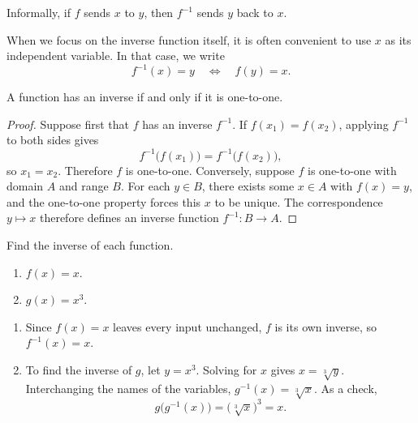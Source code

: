 Informally, if \(f\) sends \(x\) to \(y\), then \(f^{-1}\) sends \(y\) back to \(x\).

\begin{remark}
When we focus on the inverse function itself, it is often convenient to use \(x\) as its independent variable. In that case, we write
\[
f^{-1}(x) = y \quad \Longleftrightarrow \quad f(y) = x.
\]
\end{remark}

\begin{theorem}
A function has an inverse if and only if it is one-to-one.
\end{theorem}

\begin{proof}
Suppose first that \(f\) has an inverse \(f^{-1}\). If \(f(x_{1}) = f(x_{2})\), applying \(f^{-1}\) to both sides gives
\[
f^{-1}\!\bigl(f(x_{1})\bigr) = f^{-1}\!\bigl(f(x_{2})\bigr),
\]
so \(x_{1} = x_{2}\). Therefore \(f\) is one-to-one. Conversely, suppose \(f\) is one-to-one with domain \(A\) and range \(B\). For each \(y \in B\), there exists some \(x \in A\) with \(f(x) = y\), and the one-to-one property forces this \(x\) to be unique. The correspondence \(y \mapsto x\) therefore defines an inverse function \(f^{-1} : B \to A\).
\end{proof}

\begin{workedexample}
\begin{example}
Find the inverse of each function.
\begin{enumerate}
    \item \(f(x) = x\).
    \item \(g(x) = x^{3}\).
\end{enumerate}
\end{example}

\begin{solution}
\solutionbreak
\begin{enumerate}
    \item Since \(f(x) = x\) leaves every input unchanged, \(f\) is its own inverse, so \(f^{-1}(x) = x\).

    \item To find the inverse of \(g\), let \(y = x^{3}\). Solving for \(x\) gives \(x = \sqrt[3]{y}\). Interchanging the names of the variables, \(g^{-1}(x) = \sqrt[3]{x}\). As a check,
    \[
    g\!\bigl(g^{-1}(x)\bigr) = \bigl(\sqrt[3]{x}\bigr)^{3} = x.
    \]
\end{enumerate}
\end{solution}
\end{workedexample}

